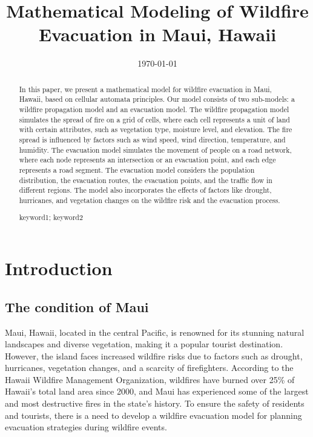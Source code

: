 \documentclass{mcmthesis}
\title{Mathematical Modeling of Wildfire Evacuation in Maui, Hawaii}
\date{\today}
\begin{document}
\begin{abstract}
In this paper, we present a mathematical model for wildfire evacuation in Maui, Hawaii, based on cellular automata principles. Our model consists of two sub-models: a wildfire propagation model and an evacuation model. The wildfire propagation model simulates the spread of fire on a grid of cells, where each cell represents a unit of land with certain attributes, such as vegetation type, moisture level, and elevation. The fire spread is influenced by factors such as wind speed, wind direction, temperature, and humidity. The evacuation model simulates the movement of people on a road network, where each node represents an intersection or an evacuation point, and each edge represents a road segment. The evacuation model considers the population distribution, the evacuation routes, the evacuation points, and the traffic flow in different regions. The model also incorporates the effects of factors like drought, hurricanes, and vegetation changes on the wildfire risk and the evacuation process.

\begin{keywords}
keyword1; keyword2
\end{keywords}
\end{abstract}
\maketitle

\tableofcontents
\newpage
\section{Introduction}
\subsection{The condition of Maui}
Maui, Hawaii, located in the central Pacific, is renowned for its stunning natural landscapes and diverse vegetation, making it a popular tourist destination. However, the island faces increased wildfire risks due to factors such as drought, hurricanes, vegetation changes, and a scarcity of firefighters. According to the Hawaii Wildfire Management Organization, wildfires have burned over 25\% of Hawaii's total land area since 2000, and Maui has experienced some of the largest and most destructive fires in the state's history. To ensure the safety of residents and tourists, there is a need to develop a wildfire evacuation model for planning evacuation strategies during wildfire events.
\end{document}
